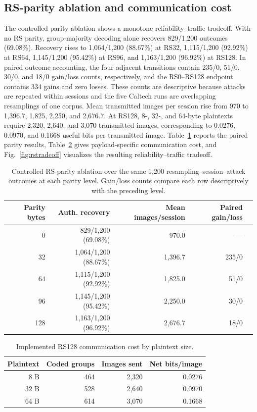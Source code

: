 \subsection{RS-parity ablation and communication cost}
The controlled parity ablation shows a monotone reliability--traffic tradeoff. With no RS parity, group-majority decoding alone recovers 829/1,200 outcomes (69.08\%). Recovery rises to 1,064/1,200 (88.67\%) at RS32, 1,115/1,200 (92.92\%) at RS64, 1,145/1,200 (95.42\%) at RS96, and 1,163/1,200 (96.92\%) at RS128. In paired outcome accounting, the four adjacent transitions contain 235/0, 51/0, 30/0, and 18/0 gain/loss counts, respectively, and the RS0--RS128 endpoint contains 334 gains and zero losses. These counts are descriptive because attacks are repeated within sessions and the five Caltech runs are overlapping resamplings of one corpus. Mean transmitted images per session rise from 970 to 1,396.7, 1,825, 2,250, and 2,676.7. At RS128, 8-, 32-, and 64-byte plaintexts require 2,320, 2,640, and 3,070 transmitted images, corresponding to 0.0276, 0.0970, and 0.1668 useful bits per transmitted image. Table~\ref{tab:rsablation} reports the paired parity results, Table~\ref{tab:commcost} gives payload-specific communication cost, and Fig.~\ref{fig:rstradeoff} visualizes the resulting reliability--traffic tradeoff.
\begin{table}[!htbp]
\caption{Controlled RS-parity ablation over the same 1,200 resampling--session--attack outcomes at each parity level. Gain/loss counts compare each row descriptively with the preceding level.}
\label{tab:rsablation}
\small
\begin{tabular}{rrrrr}
\toprule
Parity bytes & Auth. recovery & Mean images/session & Paired gain/loss\\
\midrule
0&829/1,200 (69.08\%)&970.0&---\\
32&1,064/1,200 (88.67\%)&1,396.7&235/0\\
64&1,115/1,200 (92.92\%)&1,825.0&51/0\\
96&1,145/1,200 (95.42\%)&2,250.0&30/0\\
128&1,163/1,200 (96.92\%)&2,676.7&18/0\\
\bottomrule
\end{tabular}
\end{table}
\begin{table}[!htbp]
\caption{Implemented RS128 communication cost by plaintext size.}
\label{tab:commcost}
\small
\begin{tabular}{rrrr}
\toprule
Plaintext & Coded groups & Images sent & Net bits/image\\
\midrule
8 B&464&2,320&0.0276\\
32 B&528&2,640&0.0970\\
64 B&614&3,070&0.1668\\
\bottomrule
\end{tabular}
\end{table}
